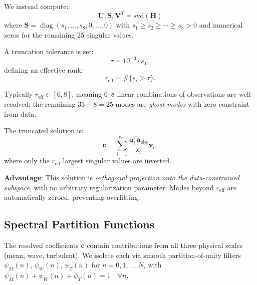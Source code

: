 \documentclass[11pt,a4paper]{article}
\begin{document}
We instead compute:
\begin{equation}
\mathbf{U}, \mathbf{S}, \mathbf{V}^T = \text{svd}(\mathbf{H})
\label{eq:svd}
\end{equation}
where $\mathbf{S} = \operatorname{diag}(s_1, \ldots, s_8, 0, \ldots, 0)$ with $s_1 \geq s_2 \geq \cdots \geq s_8 > 0$ and numerical zeros for the remaining 25 singular values.

A truncation tolerance is set:
\begin{equation}
\tau = 10^{-3} \cdot s_1,
\end{equation}
defining an effective rank:
\begin{equation}
r_{\mathrm{eff}} = \#\{s_i > \tau\}.
\end{equation}

Typically $r_{\mathrm{eff}} \in [6, 8]$, meaning 6--8 linear combinations of observations are well-resolved; the remaining $33 - 8 = 25$ modes are \emph{ghost modes} with zero constraint from data.

The truncated solution is:
\begin{equation}
\mathbf{c} = \sum_{i=1}^{r_{\mathrm{eff}}} \frac{\mathbf{u}_i^T \mathbf{a}_{\mathrm{obs}}}{s_i} \mathbf{v}_i,
\label{eq:svd_solution}
\end{equation}
where only the $r_{\mathrm{eff}}$ largest singular values are inverted.

\textbf{Advantage}: This solution is \emph{orthogonal projection onto the data-constrained subspace}, with no arbitrary regularization parameter. Modes beyond $r_{\mathrm{eff}}$ are automatically zeroed, preventing overfitting.

\subsection{Spectral Partition Functions}
\label{sec:methods:partition}

The resolved coefficients $\mathbf{c}$ contain contributions from all three physical scales (mean, wave, turbulent). We isolate each via smooth partition-of-unity filters $\psi_M(n)$, $\psi_W(n)$, $\psi_T(n)$ for $n = 0, 1, \ldots, N$, with $\psi_M(n) + \psi_W(n) + \psi_T(n) = 1 \quad \forall n$.
\end{document}
